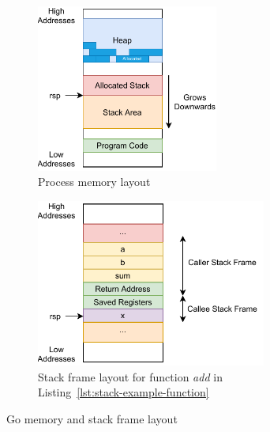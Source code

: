 \begin{figure}[htp!]
    \centering

    \begin{subfigure}[t]{0.45\textwidth}
        \centering
        \includegraphics[height=5.5cm]{assets/figures/chapter2/memory-layout.pdf}
        \caption{Process memory layout}
        \label{subfig:memory:memory-layout}
    \end{subfigure}
    \begin{subfigure}[t]{0.45\textwidth}
        \centering
        \includegraphics[height=5.5cm]{assets/figures/chapter2/stack-frame.pdf}
        \caption{Stack frame layout for function \textit{add} in Listing~\ref{lst:stack-example-function}}
        \label{subfig:memory:stack-frame}
    \end{subfigure}

    \caption{Go memory and stack frame layout}
    \label{fig:memory-stack}
\end{figure}
